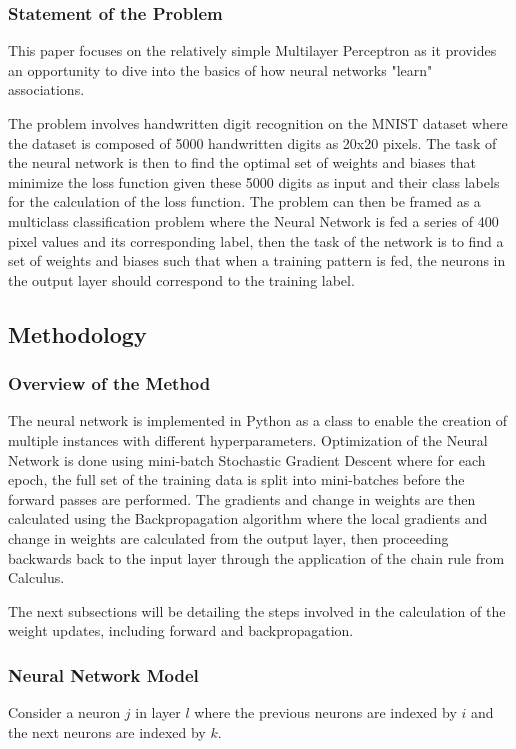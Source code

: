 \documentclass{article} %
\theoremstyle{definition}
\theoremstyle{remark}
\theoremstyle{plain}
\begin{document}
\subsubsection{Statement of the Problem}
This paper focuses on the relatively simple Multilayer Perceptron as it provides an opportunity to dive into the basics of how neural networks "learn" associations. 

The problem involves handwritten digit recognition on the MNIST dataset where the dataset is composed of 5000 handwritten digits as 20x20 pixels. The task of the neural network is then to find the optimal set of weights and biases that minimize the loss function given these 5000 digits as input and their class labels for the calculation of the loss function. The problem can then be framed as a multiclass classification problem where the Neural Network is fed a series of 400 pixel values and its corresponding label, then the task of the network is to find a set of weights and biases such that when a training pattern is fed, the neurons in the output layer should correspond to the training label.

\subsection{Methodology}

\subsubsection{Overview of the Method}
The neural network is implemented in Python as a class to enable the creation of multiple instances with different hyperparameters. Optimization of the Neural Network is done using mini-batch Stochastic Gradient Descent where for each epoch, the full set of the training data is split into mini-batches before the forward passes are performed. The gradients and change in weights are then calculated using the Backpropagation algorithm where the local gradients and change in weights are calculated from the output layer, then proceeding backwards back to the input layer through the application of the chain rule from Calculus.

The next subsections will be detailing the steps involved in the calculation of the weight updates, including forward and backpropagation.

\subsubsection{Neural Network Model}
Consider a neuron $j$ in layer $l$ where the previous neurons are indexed by $i$ and the next neurons are indexed by $k$.
\end{document}
